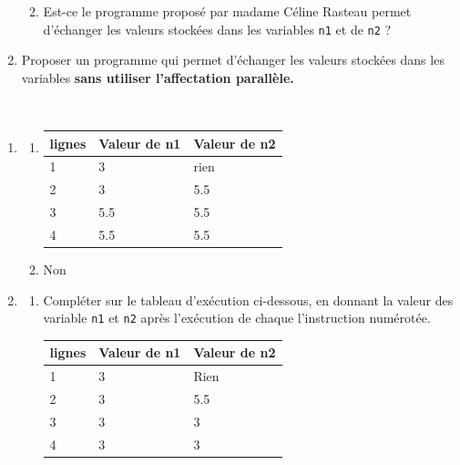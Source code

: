 \documentclass[a4paper,12pt]{article}
\begin{document}
\begin{enumerate}
\begin{enumerate}[label=\alph*.]
\begin{center}
\begin{tabular}{|l|p{5cm}|p{5cm}|}
			\end{tabular}
		\end{center}
		\item Est-ce le programme proposé par madame Céline Rasteau permet d'échanger les valeurs stockées dans les variables \lstinline{n1} et de \lstinline{n2} ?		
	\end{enumerate}
	\item  Proposer un programme qui permet d'échanger les valeurs stockées dans les variables \textbf{sans utiliser l'affectation parallèle.}
\end{enumerate}

\begin{correction}
	~\\ 
	\begin{enumerate}
		\item 
		\begin{enumerate}[label=\alph*.]
			\item 
			\begin{center}
				\begin{tabular}{|l|p{5cm}|p{5cm}|}
					\hline
					\rowcolor[HTML]{EFEFEF} 
					lignes & Valeur de n1  & Valeur de n2  \\ \hline
					1&         3 &         rien     \\ \hline
					2&         3  &        5.5      \\ \hline
					3&        5.5  &       5.5       \\ \hline
					4&        5.5  &       5.5       \\ \hline
					
				\end{tabular}
			\end{center}
			\item Non
		\end{enumerate}
		
		\item 
		\begin{enumerate}[label=\alph*.]
			\item Compléter sur le tableau d'exécution ci-dessous, en donnant la valeur des variable \lstinline{n1} et \lstinline{n2} après l'exécution de chaque l'instruction numérotée.
			\begin{center}
				\begin{tabular}{|l|p{5cm}|p{5cm}|}
					\hline
					\rowcolor[HTML]{EFEFEF} 
					lignes & Valeur de n1  & Valeur de n2  \\ \hline
					1&    3      &      Rien        \\ \hline
					2&    3      &     5.5         \\ \hline
					3&    3      &     3         \\ \hline
					4&    3      &      3        \\ \hline
					

\end{tabular}
\end{center}
\end{enumerate}
\end{enumerate}
\end{correction}
\end{document}

